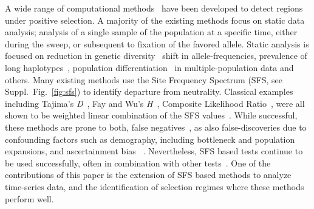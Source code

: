 A wide range of computational methods~\cite{vitti2013detecting} have
been developed to detect regions under positive selection. A majority
of the existing methods focus on static data analysis; analysis of a
single sample of the population at a specific time, either during the
sweep, or subsequent to fixation of the favored allele. Static
analysis is focused on reduction in genetic
diversity~\cite{tajima1989statistical,fay2000hitchhiking,ronen2013learning}
shift in allele-frequencies, prevalence of long
haplotypes~\cite{sabeti2006positive,vitti2013detecting}, population
differentiation~\cite{holsinger2009genetics,burke2010genome} in
multiple-population data and others. Many existing methods use the
Site Frequency Spectrum (SFS, see Suppl.~Fig.~\ref{fig:sfs}) to
identify departure from neutrality. Classical examples including
Tajima's \emph{D}~\cite{tajima1989statistical}, Fay and Wu's
\emph{H}~\cite{fay2000hitchhiking}, Composite Likelihood
Ratio~\cite{nielsen2005genomic}, were all shown to be weighted linear
combination of the SFS values~\cite{achaz2009frequency}.  While
successful, these methods are prone to both, false
negatives~\cite{messer2013population}, as also false-discoveries due
to confounding factors such as demography, including bottleneck and
population expansions, and ascertainment bias ~\cite{ptak2002evidence,
  ramos2002statistical,akey2009constructing,
  nielsen2003correcting,messer2013population}. Nevertheless, SFS based
tests continue to be used successfully, often in combination with
other tests~\cite{akey2009constructing,vitti2013detecting}. One of the
contributions of this paper is the extension of SFS based methods to
analyze time-series data, and the identification of selection regimes
where these methods perform well.

